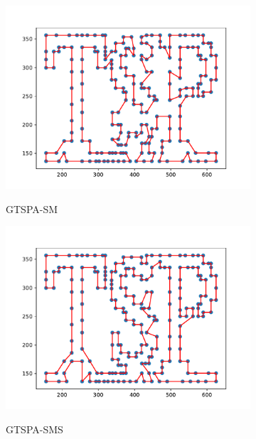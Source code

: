 \documentclass[12pt]{article}
\theoremstyle{plain}
\theoremstyle{definition}
\theoremstyle{remark}
\begin{document}
\begin{figure}[ht]
\begin{subfigure}{.5\textwidth}
		\includegraphics[scale = 0.44]{../../Implementation/gen/best_path_gtspasm_tsp225}
		\label{fig:best_path_gtspasm_tsp225}
		\caption{GTSPA-SM}
	\end{subfigure}%
	\begin{subfigure}{.5\textwidth}
		\centering
		\includegraphics[scale = 0.44]{../../Implementation/gen/best_path_gtspasms_tsp225}
		\label{fig:best_path_gtspasms_tsp225}
		\caption{GTSPA-SMS}
	\end{subfigure}
	\begin{subfigure}{.5\textwidth}
		\centering

\end{subfigure}
\end{figure}
\end{document}
